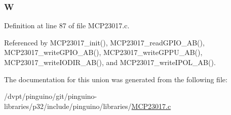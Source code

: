 \hypertarget{uniontag_m_c_p23017_u_a46abd0e479371c5e886b9236e98ce322}{
\subsubsection[{W}]{ W}}\label{uniontag_m_c_p23017_u_a46abd0e479371c5e886b9236e98ce322}


Definition at line 87 of file M\-C\-P23017.\-c.



Referenced by M\-C\-P23017\-\_\-init(), M\-C\-P23017\-\_\-read\-G\-P\-I\-O\-\_\-\-A\-B(), M\-C\-P23017\-\_\-write\-G\-P\-I\-O\-\_\-\-A\-B(), M\-C\-P23017\-\_\-write\-G\-P\-P\-U\-\_\-\-A\-B(), M\-C\-P23017\-\_\-write\-I\-O\-D\-I\-R\-\_\-\-A\-B(), and M\-C\-P23017\-\_\-write\-I\-P\-O\-L\-\_\-\-A\-B().



The documentation for this union was generated from the following file\-:\begin{DoxyCompactItemize}
\item 
/dvpt/pinguino/git/pinguino-\/libraries/p32/include/pinguino/libraries/\hyperlink{_m_c_p23017_8c}{M\-C\-P23017.\-c}\end{DoxyCompactItemize}
